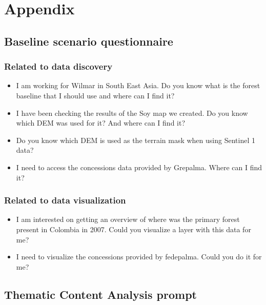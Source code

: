 \documentclass[
  oneside,
  open=any]{scrbook}
\providecommand{\tightlist}{%
  \setlength{\itemsep}{0pt}\setlength{\parskip}{0pt}}\usepackage{longtable,booktabs,array}
\begin{document}
\chapter{Appendix}\label{appendix}

\section{Baseline scenario questionnaire}\label{sec-baseline-q}

\subsection*{Related to data discovery}\label{related-to-data-discovery}

\begin{itemize}
\tightlist
\item
  I am working for Wilmar in South East Asia. Do you know what is the
  forest baseline that I should use and where can I find it?
\item
  I have been checking the results of the Soy map we created. Do you
  know which DEM was used for it? And where can I find it?
\item
  Do you know which DEM is used as the terrain mask when using Sentinel
  1 data?
\item
  I need to access the concessions data provided by Grepalma. Where can
  I find it?
\end{itemize}

\subsection*{Related to data
visualization}\label{related-to-data-visualization}

\begin{itemize}
\tightlist
\item
  I am interested on getting an overview of where was the primary forest
  present in Colombia in 2007. Could you visualize a layer with this
  data for me?
\item
  I need to visualize the concessions provided by fedepalma. Could you
  do it for me?
\end{itemize}

\section{Thematic Content Analysis prompt}\label{sec-gpt-prompt}
\end{document}
